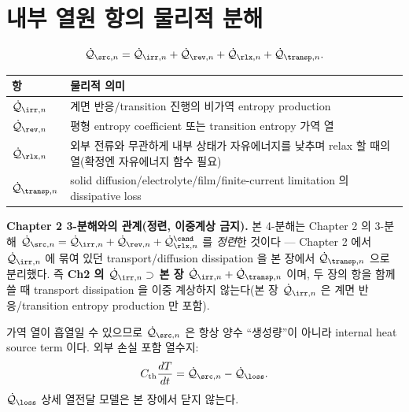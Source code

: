 \section{내부 열원 항의 물리적 분해}\label{sec:ch4_decomp}
\begin{equation}
\dot{\mathcal Q}_{\src,n}=\dot{\mathcal Q}_{\irr,n}+\dot{\mathcal Q}_{\rev,n}+\dot{\mathcal Q}_{\rlx,n}+\dot{\mathcal Q}_{\transp,n}.
\label{eq:ch4_decomp}
\end{equation}
\begin{longtable}{p{} p{}}
\toprule 항 & 물리적 의미 \\ \midrule \endhead
$\dot{\mathcal Q}_{\irr,n}$ & 계면 반응/transition 진행의 비가역 entropy production \\
$\dot{\mathcal Q}_{\rev,n}$ & 평형 entropy coefficient 또는 transition entropy 가역 열 \\
$\dot{\mathcal Q}_{\rlx,n}$ & 외부 전류와 무관하게 내부 상태가 자유에너지를 낮추며 relax 할 때의 열(확정엔 자유에너지 함수 필요) \\
$\dot{\mathcal Q}_{\transp,n}$ & solid diffusion/electrolyte/film/finite-current limitation 의 dissipative loss \\
\bottomrule
\end{longtable}
\textbf{Chapter 2 3-분해와의 관계(정련, 이중계상 금지).} 본 4-분해는 Chapter 2 의 3-분해
$\dot{\mathcal Q}_{\src,n}=\dot{\mathcal Q}_{\irr,n}+\dot{\mathcal Q}_{\rev,n}+\dot{\mathcal Q}_{\rlx,n}^{\cand}$
를 \emph{정련}한 것이다 — Chapter 2 에서 $\dot{\mathcal Q}_{\irr,n}$ 에 묶여 있던 transport/diffusion
dissipation 을 본 장에서 $\dot{\mathcal Q}_{\transp,n}$ 으로 분리했다. 즉 \textbf{Ch2 의
$\dot{\mathcal Q}_{\irr,n}\supset$ 본 장 $\dot{\mathcal Q}_{\irr,n}+\dot{\mathcal Q}_{\transp,n}$} 이며, 두
장의 항을 함께 쓸 때 transport dissipation 을 이중 계상하지 않는다(본 장 $\dot{\mathcal Q}_{\irr,n}$ 은
계면 반응/transition entropy production 만 포함).

가역 열이 흡열일 수 있으므로 $\dot{\mathcal Q}_{\src,n}$ 은 항상 양수 ``생성량''이 아니라 internal heat
source term 이다. 외부 손실 포함 열수지:
\begin{equation}
C_{\mathrm{th}}\frac{dT}{dt}=\dot{\mathcal Q}_{\src,n}-\dot{\mathcal Q}_{\loss}.
\label{eq:ch4_balance}
\end{equation}
$\dot{\mathcal Q}_{\loss}$ 상세 열전달 모델은 본 장에서 닫지 않는다.

